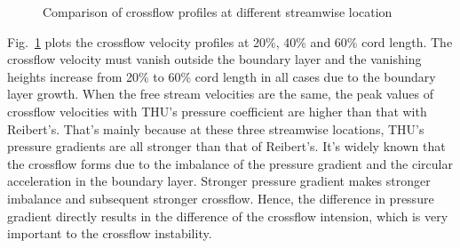 \documentclass{AIAA}
\begin{document}
\begin{figure}
\centering
{}
\caption{Comparison of crossflow profiles at different streamwise location}
\label{fig:CompCrossProfiles} %
\end{figure}

Fig.~\ref{fig:CompCrossProfiles} plots the crossflow velocity profiles at 20\%, 40\% and 60\% cord length. The crossflow velocity must vanish outside the boundary layer and the vanishing heights increase from 20\% to 60\% cord length in all cases due to the boundary layer growth. When the free stream velocities are the same, the peak values of crossflow velocities with THU's pressure coefficient are higher than that with Reibert's. That's mainly because at these three streamwise locations, THU's pressure gradients are all stronger than that of Reibert's. It's widely known that the crossflow forms due to the imbalance of the pressure gradient and the circular acceleration in the boundary layer. Stronger pressure gradient makes stronger imbalance and subsequent stronger crossflow. Hence, the difference in pressure gradient directly results in the difference of the crossflow intension, which is very important to the crossflow instability.
\end{document}
